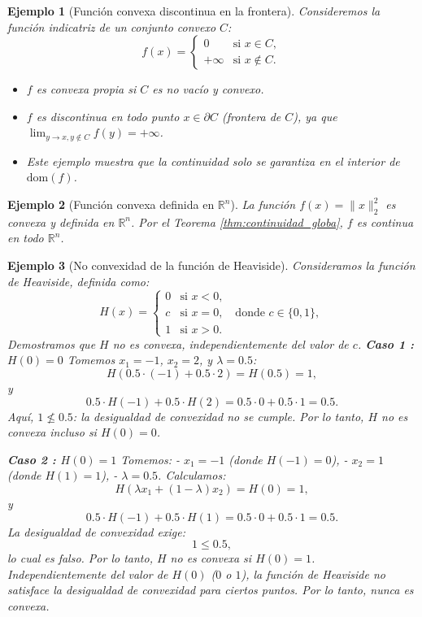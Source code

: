\documentclass[12pt]{book}
\newtheorem{ex}{Ejemplo}
\theoremstyle{definition}
\theoremstyle{plain}
\theoremstyle{remark}
\begin{document}
\begin{ex}[Función convexa discontinua en la frontera]
Consideremos la función indicatriz de un conjunto convexo \( C \):
\[
f(x) = \begin{cases}
0 & \text{si } x \in C, \\
+\infty & \text{si } x \notin C.
\end{cases}
\]
\begin{itemize}
    \item \( f \) es convexa propia si \( C \) es no vacío y convexo.
    \item \( f \) es discontinua en todo punto \( x \in \partial C \) (frontera de \( C \)), ya que \( \lim_{y \to x, y \notin C} f(y) = +\infty \).
    \item Este ejemplo muestra que la continuidad solo se garantiza en el interior de \( \text{dom}(f) \).
\end{itemize}
\end{ex}

\begin{ex}[Función convexa definida en \( \mathbb{R}^n \)]
La función \( f(x) = \|x\|_2^2 \) es convexa y definida en \( \mathbb{R}^n \). Por el Teorema \ref{thm:continuidad_globa}, \( f \) es continua en todo \( \mathbb{R}^n \).
\end{ex}

\begin{ex}[No convexidad de la función de Heaviside]
\label{ex:heaviside_non_convexe}
%
Consideramos la función de Heaviside, definida como:
\[
H(x) = \begin{cases}
0 & \text{si } x < 0, \\
c & \text{si } x = 0, \quad \text{donde } c \in \{0, 1\}, \\
1 & \text{si } x > 0.
\end{cases}
\]
Demostramos que \( H \) no es convexa, independientemente del valor de \( c \).
\textbf{Caso 1 : \( H(0) = 0 \)}
Tomemos \( x_1 = -1 \), \( x_2 = 2 \), y \( \lambda = 0.5 \):
\[
H(0.5 \cdot (-1) + 0.5 \cdot 2) = H(0.5) = 1,
\]
y
\[
0.5 \cdot H(-1) + 0.5 \cdot H(2) = 0.5 \cdot 0 + 0.5 \cdot 1 = 0.5.
\]
Aquí, \( 1 \not\leq 0.5 \): la desigualdad de convexidad no se cumple.
Por lo tanto, \( H \) no es convexa incluso si \( H(0) = 0 \).

\textbf{Caso 2 : \( H(0) = 1 \)}
Tomemos:
- \( x_1 = -1 \) (donde \( H(-1) = 0 \)),
- \( x_2 = 1 \) (donde \( H(1) = 1 \)),
- \( \lambda = 0.5 \).
Calculamos:
\[
H(\lambda x_1 + (1-\lambda) x_2) = H(0) = 1,
\]
y
\[
0.5 \cdot H(-1) + 0.5 \cdot H(1) = 0.5 \cdot 0 + 0.5 \cdot 1 = 0.5.
\]
La desigualdad de convexidad exige:
\[
1 \leq 0.5,
\]
lo cual es falso. Por lo tanto, \( H \) no es convexa si \( H(0) = 1 \).
Independientemente del valor de \( H(0) \) (\( 0 \) o \( 1 \)), la función de Heaviside no satisface la desigualdad de convexidad para ciertos puntos. Por lo tanto, nunca es convexa.
\end{ex}
\end{document}

